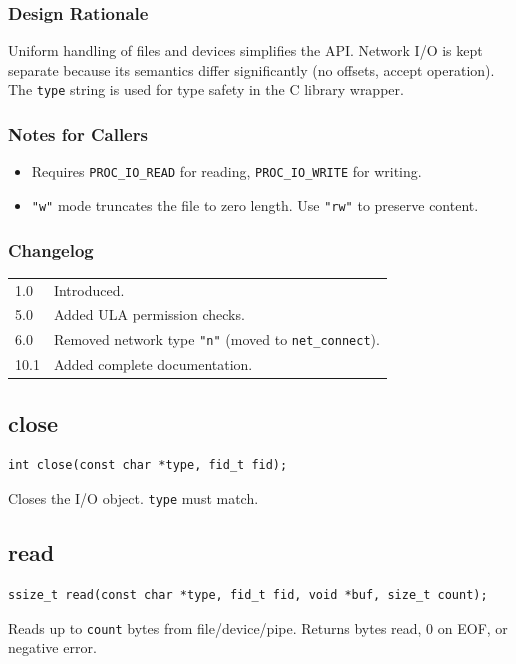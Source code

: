 \documentclass[12pt,a4paper]{article}
\begin{document}
\subsubsection{Design Rationale}
Uniform handling of files and devices simplifies the API. Network I/O is kept separate because its semantics differ significantly (no offsets, accept operation). The \texttt{type} string is used for type safety in the C library wrapper.

\subsubsection{Notes for Callers}
\begin{itemize}
    \item Requires \texttt{PROC\_IO\_READ} for reading, \texttt{PROC\_IO\_WRITE} for writing.
    \item \texttt{"w"} mode truncates the file to zero length. Use \texttt{"rw"} to preserve content.
\end{itemize}

\subsubsection{Changelog}
\begin{tabularx}{\textwidth}{|l|X|}
\hline
1.0 & Introduced. \\
5.0 & Added ULA permission checks. \\
6.0 & Removed network type \texttt{"n"} (moved to \texttt{net\_connect}). \\
10.1 & Added complete documentation. \\
\hline
\end{tabularx}

\subsection{close}
\begin{lstlisting}
int close(const char *type, fid_t fid);
\end{lstlisting}
Closes the I/O object. \texttt{type} must match.

\subsection{read}
\begin{lstlisting}
ssize_t read(const char *type, fid_t fid, void *buf, size_t count);
\end{lstlisting}
Reads up to \texttt{count} bytes from file/device/pipe. Returns bytes read, 0 on EOF, or negative error.
\end{document}
